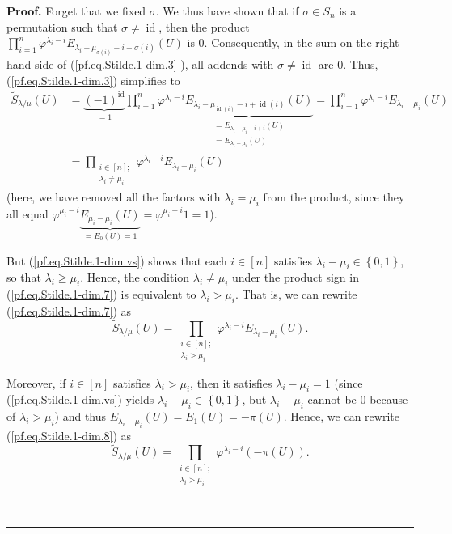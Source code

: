 \documentclass[numbers=enddot,12pt,final,onecolumn,notitlepage]{scrartcl}%
\numberwithin{exer}{section}
\theoremstyle{definition}
\newenvironment{proof}[1][Proof]{\noindent\textbf{#1.} }{\ \rule{0.5em}{0.5em}}
\let\prodnonlimits\prod
\renewcommand{\prod}{\prodnonlimits\limits}
\theoremstyle{plainsl}
\begin{document}
\begin{proof}
Forget that we fixed $\sigma$. We thus have shown that if $\sigma\in S_{n}$ is
a permutation such that $\sigma\neq\operatorname*{id}$, then the product
$\prod_{i=1}^{n}\varphi^{\lambda_{i}-i}E_{\lambda_{i}-\mu_{\sigma\left(
i\right)  }-i+\sigma\left(  i\right)  }\left(  U\right)  $ is $0$.
Consequently, in the sum on the right hand side of (\ref{pf.eq.Stilde.1-dim.3}%
), all addends with $\sigma\neq\operatorname*{id}$ are $0$. Thus,
(\ref{pf.eq.Stilde.1-dim.3}) simplifies to%
\begin{align}
\widetilde{S}_{\lambda/\mu}\left(  U\right)   &  =\underbrace{\left(
-1\right)  ^{\operatorname*{id}}}_{=1}\prod_{i=1}^{n}\varphi^{\lambda_{i}%
-i}\underbrace{E_{\lambda_{i}-\mu_{\operatorname*{id}\left(  i\right)
}-i+\operatorname*{id}\left(  i\right)  }\left(  U\right)  }%
_{\substack{=E_{\lambda_{i}-\mu_{i}-i+i}\left(  U\right)  \\=E_{\lambda
_{i}-\mu_{i}}\left(  U\right)  }}=\prod_{i=1}^{n}\varphi^{\lambda_{i}%
-i}E_{\lambda_{i}-\mu_{i}}\left(  U\right) \nonumber\\
&  =\prod_{\substack{i\in\left[  n\right]  ;\\\lambda_{i}\neq\mu_{i}}%
}\varphi^{\lambda_{i}-i}E_{\lambda_{i}-\mu_{i}}\left(  U\right)
\label{pf.eq.Stilde.1-dim.7}%
\end{align}
(here, we have removed all the factors with $\lambda_{i}=\mu_{i}$ from the
product, since they all equal $\varphi^{\mu_{i}-i}\underbrace{E_{\mu_{i}%
-\mu_{i}}\left(  U\right)  }_{=E_{0}\left(  U\right)  =1}=\varphi^{\mu_{i}%
-i}1=1$).

But (\ref{pf.eq.Stilde.1-dim.vs}) shows that each $i\in\left[  n\right]  $
satisfies $\lambda_{i}-\mu_{i}\in\left\{  0,1\right\}  $, so that $\lambda
_{i}\geq\mu_{i}$. Hence, the condition $\lambda_{i}\neq\mu_{i}$ under the
product sign in (\ref{pf.eq.Stilde.1-dim.7}) is equivalent to $\lambda_{i}%
>\mu_{i}$. That is, we can rewrite (\ref{pf.eq.Stilde.1-dim.7}) as%
\begin{equation}
\widetilde{S}_{\lambda/\mu}\left(  U\right)  =\prod_{\substack{i\in\left[
n\right]  ;\\\lambda_{i}>\mu_{i}}}\varphi^{\lambda_{i}-i}E_{\lambda_{i}%
-\mu_{i}}\left(  U\right)  . \label{pf.eq.Stilde.1-dim.8}%
\end{equation}


Moreover, if $i\in\left[  n\right]  $ satisfies $\lambda_{i}>\mu_{i}$, then it
satisfies $\lambda_{i}-\mu_{i}=1$ (since (\ref{pf.eq.Stilde.1-dim.vs}) yields
$\lambda_{i}-\mu_{i}\in\left\{  0,1\right\}  $, but $\lambda_{i}-\mu_{i}$
cannot be $0$ because of $\lambda_{i}>\mu_{i}$) and thus $E_{\lambda_{i}%
-\mu_{i}}\left(  U\right)  =E_{1}\left(  U\right)  =-\pi\left(  U\right)  $.
Hence, we can rewrite (\ref{pf.eq.Stilde.1-dim.8}) as%
\[
\widetilde{S}_{\lambda/\mu}\left(  U\right)  =\prod_{\substack{i\in\left[
n\right]  ;\\\lambda_{i}>\mu_{i}}}\varphi^{\lambda_{i}-i}\left(  -\pi\left(
U\right)  \right)  .
\]



\end{proof}
\end{document}
